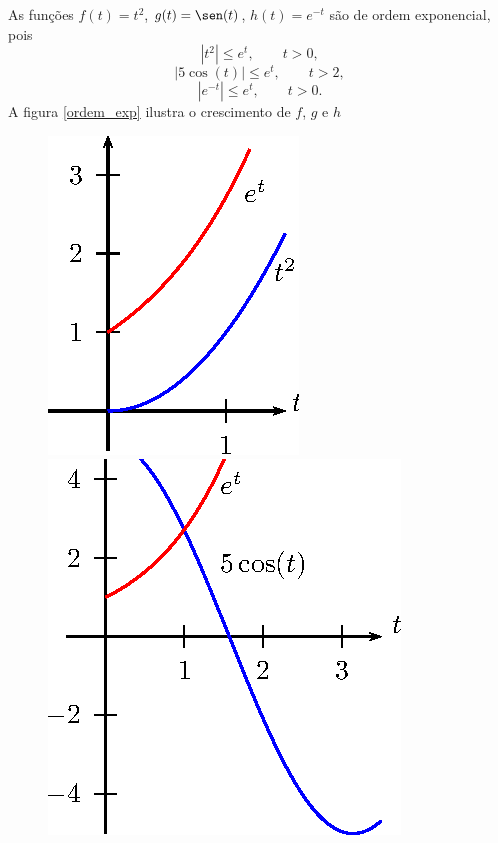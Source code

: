 \begin{ex}As funções $f(t)=t^2$, $g(t)=\sen(t)$, $h(t)=e^{-t}$ são de ordem exponencial, pois
\begin{equation}
|t^2|\leq e^t,\qquad t>0,
\end{equation}
\begin{equation}
|5\cos(t)|\leq e^t,\qquad t>2,
\end{equation}
\begin{equation}
|e^{-t}|\leq e^t,\qquad t>0.
\end{equation}
A figura \ref{ordem_exp} ilustra o crescimento de $f$, $g$ e $h$
\begin{figure}[!ht]
\begin{center}

\includegraphics{cap_definicao/pics/figura_1}
\includegraphics{cap_definicao/pics/figura_2}

\end{center}
\end{figure}
\end{ex}
